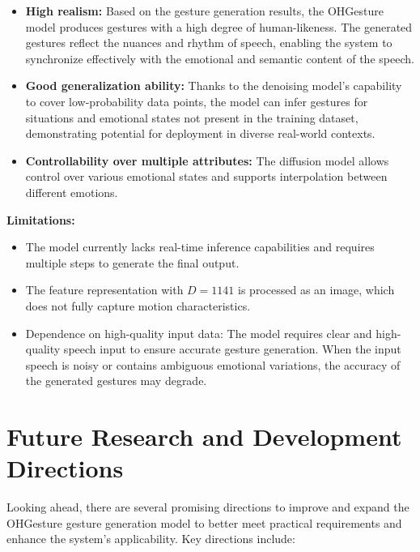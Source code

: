 \begin{itemize}
	\item \textbf{High realism:} Based on the gesture generation results, the OHGesture model produces gestures with a high degree of human-likeness. The generated gestures reflect the nuances and rhythm of speech, enabling the system to synchronize effectively with the emotional and semantic content of the speech.
	
	\item \textbf{Good generalization ability:} Thanks to the denoising model's capability to cover low-probability data points, the model can infer gestures for situations and emotional states not present in the training dataset, demonstrating potential for deployment in diverse real-world contexts.
	
	\item \textbf{Controllability over multiple attributes:} The diffusion model allows control over various emotional states and supports interpolation between different emotions.
\end{itemize}

\textbf{Limitations:}

\begin{itemize}
	\item The model currently lacks real-time inference capabilities and requires multiple steps to generate the final output.
	
	\item The feature representation with $D=1141$ is processed as an image, which does not fully capture motion characteristics.
	
	\item Dependence on high-quality input data: The model requires clear and high-quality speech input to ensure accurate gesture generation. When the input speech is noisy or contains ambiguous emotional variations, the accuracy of the generated gestures may degrade.
\end{itemize}

\section{Future Research and Development Directions}

Looking ahead, there are several promising directions to improve and expand the OHGesture gesture generation model to better meet practical requirements and enhance the system’s applicability. Key directions include:

